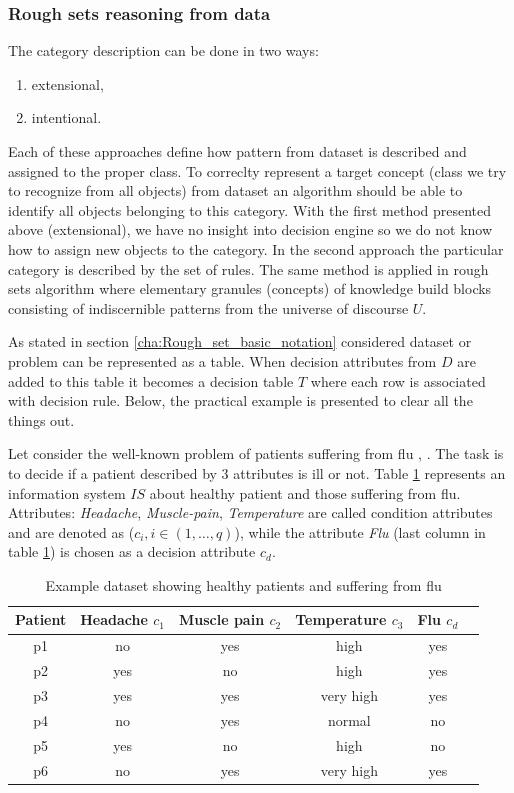 \subsubsection{Rough sets reasoning from data}
The category description can be done in two ways:
\begin{enumerate}
    \item extensional,
    \item intentional.
\end{enumerate}
Each of these approaches define how pattern from dataset is
described and assigned to the proper class. To correclty represent 
a target concept (class we try to recognize from all objects) from dataset an
algorithm should be able to identify all objects belonging 
to this category. With the first method presented above (extensional), we have no insight 
into decision engine so we do not know how to assign new objects to the category.
In the second approach the particular category is described by the set of rules. 
The same method is applied in rough sets algorithm where elementary 
granules (concepts) of knowledge build blocks consisting 
of indiscernible patterns from the universe of discourse $U$. 

As stated in section \ref{cha:Rough_set_basic_notation} considered dataset or
problem can be represented as a table. When decision attributes from $D$ are
added to this table it becomes a decision table $T$ where each
row is associated with decision rule. Below, the practical example is presented to 
clear all the things out. 

Let consider the well-known problem of patients suffering from
flu \cite{bib39}, \cite{bib40}. The task is to decide if a patient described by
3 attributes is ill or not. Table \ref{tab:example_rough_set} 
represents an information system $IS$ about healthy patient and those suffering
from flu. Attributes: \textit{Headache}, \textit{Muscle-pain},
\textit{Temperature} are called condition attributes and are denoted as ($c_i,i \in (1, \ldots, q)$),
while the attribute \textit{Flu} (last column in table
\ref{tab:example_rough_set}) is chosen as a decision attribute $c_d$.
\begin{table}[H] 
    \centering
    \caption{Example dataset showing healthy patients and suffering from flu}
    \begin{tabular}{|c|c|c|c|c|c|}
        \hline 
    Patient & Headache $c_1$& Muscle pain $c_2$& Temperature $c_3$& Flu $c_d$\\ \hline \hline
    p1 & no & yes & high & yes \\ \hline
    p2 & yes & no & high & yes \\ \hline
    p3 & yes & yes & very high & yes \\ \hline
    p4 & no & yes & normal & no \\ \hline
    p5 & yes & no & high & no \\ \hline
    p6 & no & yes & very high & yes \\ \hline    
    \end{tabular}
    \label{tab:example_rough_set}
\end{table}

